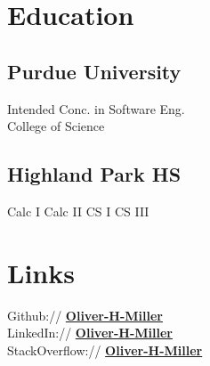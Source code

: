 \documentclass[letterpaper]{deedy-resume} %
\begin{document}
\begin{minipage}[t]{0.33\textwidth} %


\section{Education} 

\subsection{Purdue University}

%

Intended Conc. in Software Eng. \\
College of Science \\

\sectionspace %


\subsection{Highland Park HS}

Calc I \textbullet{} Calc II \textbullet{} CS I \textbullet{} CS III

\sectionspace %


\section{Links} 

Github:// \href{https://github.com/Oliver-H-Miller}{\bf Oliver-H-Miller} \\
LinkedIn:// \href{https://www.linkedin.com/in/Oliver-H-Miller}{\bf Oliver-H-Miller} \\
StackOverflow:// \href{https://stackoverflow.com/users/3152313}{\bf Oliver-H-Miller} \\


\end{minipage}
\end{document}
